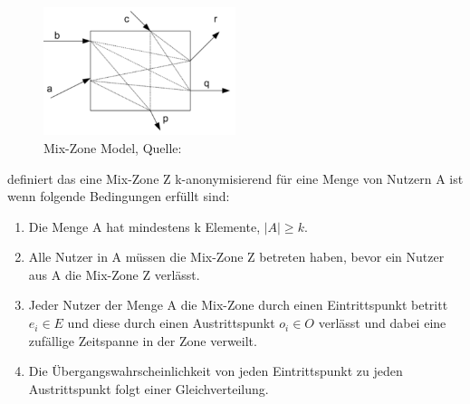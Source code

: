 \begin{figure}[!h]
		\centering
		\includegraphics[width=0.5\textwidth]{Bilder/MixZone.PNG}
		\caption{Mix-Zone Model, Quelle: \protect\cite{Palanisamy2011}}
		\label{fig_Palanisamy2011}
\end{figure}

\cite{Palanisamy2011} definiert das eine Mix-Zone Z k-anonymisierend für eine Menge von Nutzern A ist wenn folgende Bedingungen erfüllt sind:
\begin{enumerate}
\item Die Menge A hat mindestens k Elemente, $ |A| \geq k $.
\item Alle Nutzer in A müssen die Mix-Zone Z betreten haben, bevor ein Nutzer aus A die Mix-Zone Z verlässt.
\item Jeder Nutzer der Menge A die Mix-Zone durch einen Eintrittspunkt betritt $ e_{i} \in E $ und diese durch einen Austrittspunkt $ o_{i} \in O $ verlässt und dabei eine zufällige Zeitspanne in der Zone verweilt.
\item Die Übergangswahrscheinlichkeit von jeden Eintrittspunkt zu jeden Austrittspunkt folgt einer Gleichverteilung.
\end{enumerate}

